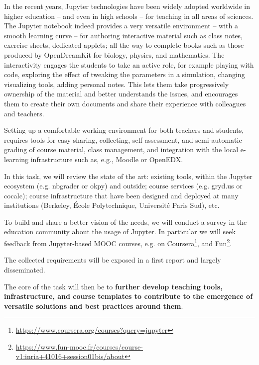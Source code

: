 \begin{task}[
  title=Teaching tools, infrastructure, and best practices,
  id=teaching-tools,
  lead=EP,
  PM=20, %
  wphases={0-36},
  partners={EP,UPSUD}]

  In the recent years, Jupyter technologies have been widely adopted
  worldwide in higher education -- and even in high schools -- for
  teaching in all areas of sciences. The Jupyter notebook indeed
  provides a very versatile environment -- with a smooth learning
  curve -- for authoring interactive material such as class notes,
  exercise sheets, dedicated applets; all the way to complete books
  such as those produced by OpenDreamKit for biology, physics, and
  mathematics. The interactivity engages the students to take an
  active role, for example playing with code, exploring the effect of
  tweaking the parameters in a simulation, changing visualizing tools,
  adding personal notes. This lets them take progressively ownership
  of the material and better understands the issues, and encourages
  them to create their own documents and share their experience with
  colleagues and teachers.

  Setting up a comfortable working environment for both teachers and
  students, requires tools for easy sharing, collecting, self
  assessment, and semi-automatic grading of course material, class
  management, and integration with the local e-learning infrastructure
  such as, e.g., Moodle or OpenEDX.

  In this task, we will review the state of the art: existing tools,
  within the Jupyter ecosystem (e.g. nbgrader or okpy) and outside;
  course services (e.g. gryd.us or cocalc); course infrastructure that
  have been designed and deployed at many institutions (Berkeley,
  École Polytechnique, Université Paris Sud), etc.

  To build and share a better vision of the needs, we will conduct a
  survey in the education community about the usage of Jupyter. In
  particular we will seek feedback from Jupyter-based MOOC courses,
  e.g. on
  Coursera\footnote{\url{https://www.coursera.org/courses?query=jupyter}},
  and
  Fun\footnote{\url{https://www.fun-mooc.fr/courses/course-v1:inria+41016+session01bis/about}}.

  The collected requirements will be exposed in a first report
   and largely disseminated.

  The core of the task will then be to \textbf{further develop
    teaching tools, infrastructure, and course templates to contribute
    to the emergence of versatile solutions and best practices around
    them}.


\end{task}
